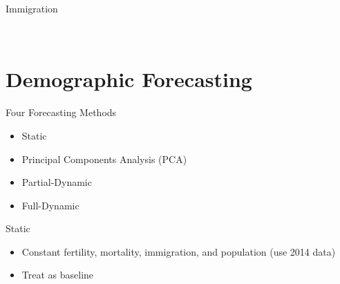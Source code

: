 \documentclass[12pt]{beamer}
\newcommand*{\FigureDir}{../graphs}
\begin{document}
\begin{frame}{Immigration}

	\begin{figure}[H]
		\centering
		\vspace{-3mm}
		\\ 
	 \end{figure}

\end{frame}

\section{Demographic Forecasting}

\begin{frame}{Four Forecasting Methods}

	\begin{itemize}
		\item Static
		\item Principal Components Analysis (PCA)
		\item Partial-Dynamic
		\item Full-Dynamic
	\end{itemize}

\end{frame}

\begin{frame}{Static}

	\begin{itemize}
		\item Constant fertility, mortality, immigration, and population (use 2014 data)
		\item Treat as baseline
	\end{itemize}

\end{frame}
\end{document}
